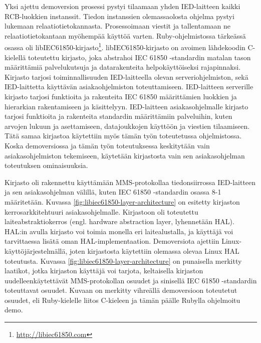 Yksi ajettu demoversion prosessi pystyi tilaamaan yhden IED-laitteen kaikki RCB-luokkien instanssit. Tiedon instanssien olemassaolosta ohjelma pystyi lukemaan relaatiotietokannasta. Prosessoimaan viestit ja tallentamaan ne relaatiotietokantaan myöhempää käyttöä varten. Ruby-ohjelmistossa tärkeässä osassa oli libIEC61850-kirjasto\footnote{\url{http://libiec61850.com}}. libIEC61850-kirjasto on avoimen lähdekoodin C-kielellä toteutettu kirjasto, joka abstrahoi IEC 61850 -standardin matalan tason määrittämiä palvelukutsuja ja datarakenteita helpokäyttöiseksi rajapinnaksi. Kirjasto tarjosi toiminnallisuuden IED-laitteella olevan serveriohjelmiston, sekä IED-laittetta käyttävän asiakaohjelmiston toteuttamiseen. IED-laitteen serverille kirjasto tarjosi funktioita ja rakenteita IEC 61850 määrittämien luokkien ja hierarkian rakentamiseen ja käsittelyyn. IED-laitteen asiakasohjelmalle kirjasto tarjosi funktioita ja rakenteita standardin määrittämiin palveluihin, kuten arvojen lukuun ja asettamiseen, datajoukkojen käyttöön ja viestien tilaamiseen. Tätä samaa kirjastoa käytettiin myös tämän työn toteutetussa ohjelmistossa. Koska demoversiossa ja tämän työn toteutuksessa keskitytään vain asiakasohjelmiston tekemiseen, käytetään kirjastosta vain sen asiakasohjelman toteutuksen ominaisuuksia.

Kirjasto oli rakennettu käyttämään MMS-protokollaa tiedonsiirrossa IED-laitteen ja sen asiakasohjelman välillä, kuten IEC 61850 -standardin osassa 8-1 määritetään. Kuvassa \ref{fig:libiec61850-layer-architecture} on esitetty kirjaston kerrosarkkitehtuuri asiakasohjelmalle. Kirjastoon oli toteutettu laiteabstraktiokerros (engl. hardware abstraction layer, lyhennetään HAL). HAL:in avulla kirjasto voi toimia monella eri laitealustalla, ja käyttäjä voi tarvittaessa lisätä oman HAL-implementaation. Demoversiota ajettiin Linux-käyttöjärjestelmällä, joten kirjastosta käytettiin olemassa olevaa Linux HAL toteutusta. Kuvassa \ref{fig:libiec61850-layer-architecture} on punaisella merkitty laatikot, jotka kirjaston käyttäjä voi tarjota, keltaisella kirjaston uudelleenkäytettävät MMS-protokollan osuudet ja sinisellä IEC 61850 -standardin toteuttavat osuudet. Kuvaan on merkitty vihreällä demoversioon toteutetut osuudet, eli Ruby-kielelle liitos C-kieleen ja tämän päälle Rubylla ohjelmoitu demo.

